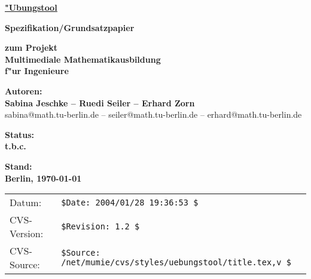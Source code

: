 
\pagestyle{empty}

\phantom{a}
\vspace{10mm}

\begin{center}

\underline{\underline{\Huge\bf "Ubungstool}}

\vspace{18mm}

{\Large\bf Spezifikation/Grundsatzpapier}

\vspace{18mm}

{\Large\bf zum Projekt}\\[2ex]
{\large\bf Multimediale Mathematikausbildung}\\[1ex]
{\large\bf f"ur Ingenieure}

\vspace{18mm}

{\Large\bf Autoren:}\\[2ex]
{\large\bf Sabina Jeschke -- Ruedi Seiler -- Erhard Zorn}\\[1ex]
sabina@math.tu-berlin.de -- seiler@math.tu-berlin.de -- erhard@math.tu-berlin.de

\vspace{18mm}

{\Large\bf Status:}\\[2ex]
{\large\bf t.b.c.}

\vspace{18mm}

{\Large\bf Stand:}\\[2ex]
{\large\bf Berlin, \today}

\end{center}

\begin{tabular}{ll}
\textsf{Datum:}& \verb+$Date: 2004/01/28 19:36:53 $+\\                  %
\textsf{CVS-Version:}& \verb+$Revision: 1.2 $+\\                %
\textsf{CVS-Source:}&\verb+$Source: /net/mumie/cvs/styles/uebungstool/title.tex,v $+\\ %
\end{tabular}

\newpage

\phantom{was auch immer...}

\setcounter{page}{0}

\clearpage

\pagestyle{plain}




